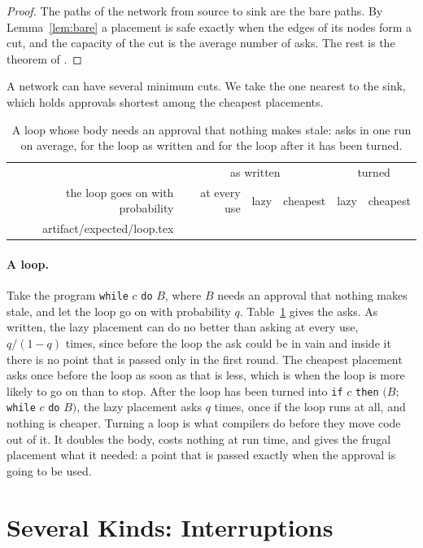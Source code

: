 \documentclass[acmsmall,nonacm,screen]{acmart}
\makeatletter
\newcommand{\claim}[2]{#2}
\newcommand{\rows}[1]{\@@input artifact/expected/#1.tex }
\makeatother
\begin{document}
\begin{proof}
The paths of the network from source to sink are the bare paths. By Lemma~\ref{lem:bare} a
placement is safe exactly when the edges of its nodes form a cut, and the capacity of the
cut is the average number of asks. The rest is the theorem of \citet{ford1956}.
\end{proof}

A network can have several minimum cuts. We take the one nearest to the sink, which holds
approvals shortest among the cheapest placements.

\begin{table}
\caption{A loop whose body needs an approval that nothing makes stale: asks in one run on
average, for the loop as written and for the loop after it has been turned.}
\label{tab:loop}
\small
\begin{tabular}{rrrrrr}
\toprule
 & \multicolumn{3}{c}{as written} & \multicolumn{2}{c}{turned} \\
the loop goes on with probability & at every use & lazy & cheapest & lazy & cheapest \\
\midrule
\rows{loop}
\bottomrule
\end{tabular}
\end{table}

\paragraph{A loop.} Take the program \texttt{while} $c$ \texttt{do} $B$, where $B$ needs an
approval that nothing makes stale, and let the loop go on with probability $q$.
\claim{loop}{Table~\ref{tab:loop} gives the asks. As written, the lazy placement can do no
better than asking at every use, $q / (1 - q)$ times, since before the loop the ask could be
in vain and inside it there is no point that is passed only in the first round. The
cheapest placement asks once before the loop as soon as that is less, which is when the loop
is more likely to go on than to stop. After the loop has been turned into \texttt{if} $c$
\texttt{then} $(B;$ \texttt{while} $c$ \texttt{do} $B)$, the lazy placement asks $q$ times,
once if the loop runs at all, and nothing is cheaper.} Turning a loop is what compilers do
before they move code out of it. It doubles the body, costs nothing at run time, and gives
the frugal placement what it needed: a point that is passed exactly when the approval is
going to be used.

\section{Several Kinds: Interruptions}
\label{sec:kinds}
\end{document}
